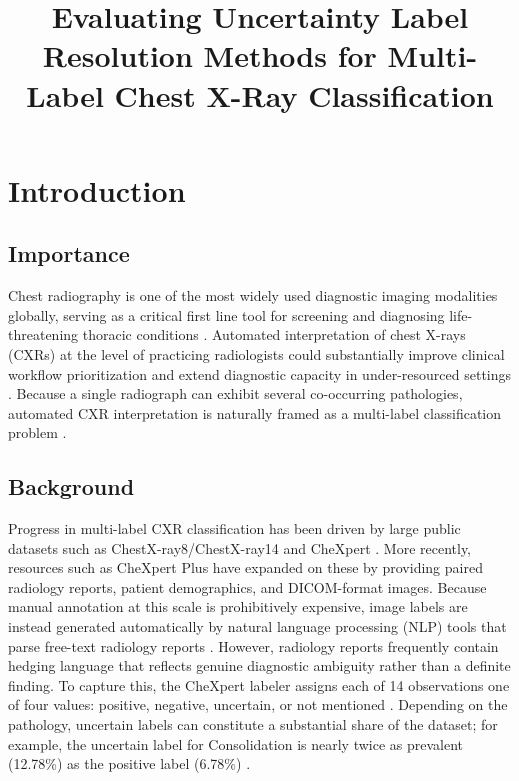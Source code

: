\documentclass[conference]{IEEEtran}
\begin{document}
\nocite{ref1,ref2,ref3,ref4,ref5,ref6,ref7,ref8,ref9,ref10,ref11,ref12,ref13,ref14,ref15,ref16,ref17}

\title{Evaluating Uncertainty Label Resolution Methods for Multi-Label Chest X-Ray Classification}

\author{
}

\maketitle

\IEEEpeerreviewmaketitle

\section{Introduction}

\subsection{Importance}
Chest radiography is one of the most widely used diagnostic imaging modalities globally, serving as a critical first line tool for screening and diagnosing life-threatening thoracic conditions \cite{ref1,ref2,ref9,ref10,ref11,ref12}. Automated interpretation of chest X-rays (CXRs) at the level of practicing radiologists could substantially improve clinical workflow prioritization and extend diagnostic capacity in under-resourced settings \cite{ref2,ref3,ref9,ref11,ref12}. Because a single radiograph can exhibit several co-occurring pathologies, automated CXR interpretation is naturally framed as a multi-label classification problem \cite{ref1,ref3,ref9,ref10,ref13}.

\subsection{Background}
Progress in multi-label CXR classification has been driven by large public datasets such as ChestX-ray8/ChestX-ray14 \cite{ref3,ref12} and CheXpert \cite{ref1,ref10}. More recently, resources such as CheXpert Plus \cite{ref4} have expanded on these by providing paired radiology reports, patient demographics, and DICOM-format images. Because manual annotation at this scale is prohibitively expensive, image labels are instead generated automatically by natural language processing (NLP) tools that parse free-text radiology reports \cite{ref1,ref3,ref12,ref13,ref15}. However, radiology reports frequently contain hedging language \cite{ref1} that reflects genuine diagnostic ambiguity \cite{ref12,ref15} rather than a definite finding. To capture this, the CheXpert labeler assigns each of 14 observations one of four values: positive, negative, uncertain, or not mentioned \cite{ref1}. Depending on the pathology, uncertain labels can constitute a substantial share of the dataset; for example, the uncertain label for Consolidation is nearly twice as prevalent (12.78\%) as the positive label (6.78\%) \cite{ref1}.
\end{document}
